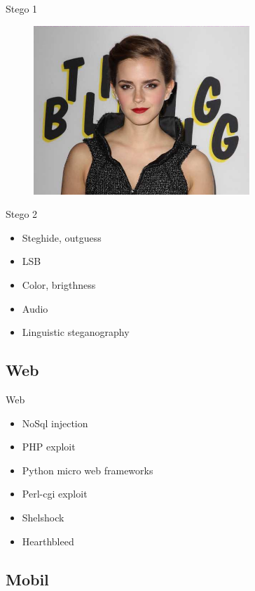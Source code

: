 \documentclass[compress]{beamer}
\begin{document}
\begin{frame}{Stego 1}
	\begin{figure}
		\centering
		\includegraphics[width=\textwidth,height=2.5in]{images/s11.png}
	\end{figure}
\end{frame}

\begin{frame}{Stego 2}

\begin{itemize}
	\item Steghide, outguess
    \item LSB
    \item Color, brigthness
    \item Audio
    \item Linguistic steganography
\end{itemize}

\end{frame}

\subsection{Web}

\begin{frame}{Web}

\begin{itemize}
	\item NoSql injection
    \item PHP exploit
    \item Python micro web frameworks
    \item Perl-cgi exploit
    \item Shelshock
    \item Hearthbleed
\end{itemize}

\end{frame}

\subsection{Mobil}
\end{document}
